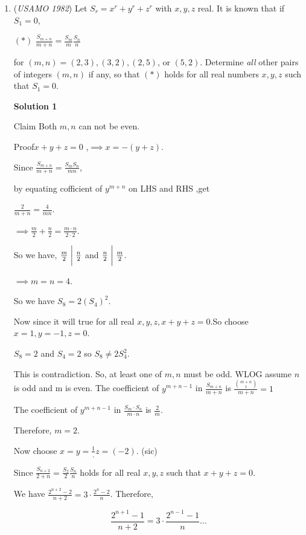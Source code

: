 \begin{enumerate}
 


	\item (\textit{USAMO 1982}) Let $S_r=x^r+y^r+z^r$ with $x,y,z$ real. It is known that if $S_1=0$,


 $(*)$ $\frac{S_{m+n}}{m+n}=\frac{S_m}{m}\frac{S_n}{n}$


 for $(m,n)=(2,3),(3,2),(2,5)$, or $(5,2)$. Determine \textit{all} other pairs of integers $(m,n)$ if any, so that $(*)$ holds for all real numbers $x,y,z$ such that $S_1=0$.


 



\textbf{Solution 1}

Claim Both $m,n$ can not be even.

 Proof$x+y+z=0$ ,$\implies x=-(y+z)$.

 Since $\frac{S_{m+n}}{m+n} = \frac{S_m S_n}{mn}$,

 by equating cofficient of $y^{m+n}$ on LHS and RHS ,get

 $\frac{2}{m+n}=\frac{4}{mn}$.

 $\implies  \frac{m}{2} + \frac {n}{2} = \frac{m\cdot n}{2\cdot2}$.

 So we have, $\frac{m}{2} \biggm{|} \frac{n}{2}$ and $\frac{n}{2} \biggm{|} \frac{m}{2}$.

 $\implies m=n=4$.

 So we have $S_8=2(S_4)^2$.

 Now since it will true for all real $x,y,z,x+y+z=0$.So choose $x=1,y=-1,z=0$.

 $S_8=2$ and $S_4=2$ so $S_8 \neq 2 S_4^2$.

 This is contradiction. So, at least one of $m,n$ must be odd. WLOG assume $n$ is odd and m is even. The coefficient of $y^{m+n-1}$ in $\frac{S_{m+n}}{m+n}$ is $\frac{\binom{m+n}{1} }{m+n} =1$

 The coefficient of $y^{m+n-1}$ in $\frac{S_m\cdot S_n}{m\cdot n}$ is $\frac{2}{m}$.

 Therefore, $\boxed{m=2}$.

 Now choose $x=y=\frac1,z=(-2)$. (sic)

 Since $\frac{S_{n+2}}{2+n}=\frac{S_2}{2}\frac{S_n}{n}$ holds for all real $x,y,z$ such that $x+y+z=0$.

 We have $\frac{2^{n+2}-2}{n+2} = 3\cdot\frac{2^n-2}{n}$. Therefore,

 \begin{equation*}\label{eq:l2}\frac{2^{n+1}-1}{n+2} =3\cdot\frac{2^{n-1}-1}{n}\ldots\tag{**}\end{equation*}


\end{enumerate}
